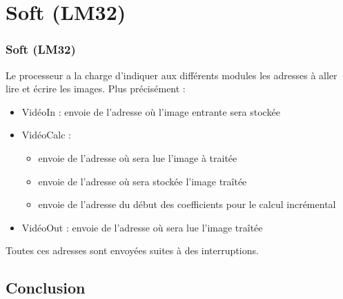 \documentclass[a4paper,12pt]{report}
\begin{document}
    \part{Soft (LM32)} 

    \section*{Soft (LM32)}

{Le processeur a la charge d'indiquer aux différents modules les adresses à aller lire et écrire les images. Plus précisément :

\begin{itemize}
	\item VidéoIn : envoie de l'adresse où l'image entrante sera stockée
	\item VidéoCalc : \begin{itemize}
								\item envoie de l'adresse où sera lue l'image à traitée
								\item envoie de l'adresse où sera stockée l'image traîtée
								\item envoie de l'adresse du début des coefficients pour le calcul incrémental
							\end{itemize}
	\item VidéoOut : envoie de l'adresse où sera lue l'image traîtée
\end{itemize}

Toutes ces adresses sont envoyées suites à des interruptions.
}



 
    \chapter*{Conclusion}
{}


\end{document}
